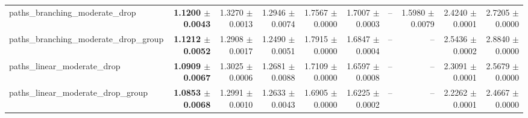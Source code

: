 \begin{tabular}{@{}lrrrrrrrrr@{}}
paths\_branching\_moderate\_drop & \textbf{1.1200 $\pm$ 0.0043} & 1.3270 $\pm$ 0.0013 & 1.2946 $\pm$ 0.0074 & 1.7567 $\pm$ 0.0000 & 1.7007 $\pm$ 0.0003 & -- & 1.5980 $\pm$ 0.0079 & 2.4240 $\pm$ 0.0001 & 2.7205 $\pm$ 0.0000 \\
paths\_branching\_moderate\_drop\_group & \textbf{1.1212 $\pm$ 0.0052} & 1.2908 $\pm$ 0.0017 & 1.2490 $\pm$ 0.0051 & 1.7915 $\pm$ 0.0000 & 1.6847 $\pm$ 0.0004 & -- & -- & 2.5436 $\pm$ 0.0002 & 2.8840 $\pm$ 0.0000 \\
paths\_linear\_moderate\_drop & \textbf{1.0909 $\pm$ 0.0067} & 1.3025 $\pm$ 0.0006 & 1.2681 $\pm$ 0.0088 & 1.7109 $\pm$ 0.0000 & 1.6597 $\pm$ 0.0008 & -- & -- & 2.3091 $\pm$ 0.0001 & 2.5679 $\pm$ 0.0000 \\
paths\_linear\_moderate\_drop\_group & \textbf{1.0853 $\pm$ 0.0068} & 1.2991 $\pm$ 0.0010 & 1.2633 $\pm$ 0.0043 & 1.6905 $\pm$ 0.0000 & 1.6225 $\pm$ 0.0002 & -- & -- & 2.2262 $\pm$ 0.0001 & 2.4667 $\pm$ 0.0000 \\
\bottomrule
\end{tabular}

